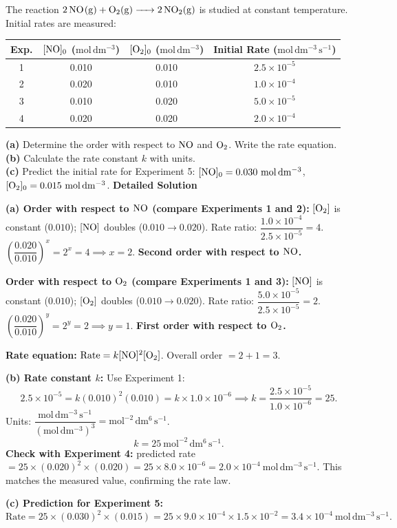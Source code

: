 \documentclass[11pt]{article}
\begin{document}
\begin{exoresolu}
The reaction $\ce{2NO(g) + O2(g) -> 2NO2(g)}$ is studied at constant temperature. Initial rates are measured:

\begin{center}
\begin{tabular}{|c|cc|c|}\hline
Exp. & $[\ce{NO}]_0$ ($\mathrm{mol\,dm^{-3}}$) & $[\ce{O2}]_0$ ($\mathrm{mol\,dm^{-3}}$) & Initial Rate ($\mathrm{mol\,dm^{-3}\,s^{-1}}$) \\ \hline
1 & 0.010 & 0.010 & $2.5 \times 10^{-5}$ \\
2 & 0.020 & 0.010 & $1.0 \times 10^{-4}$ \\
3 & 0.010 & 0.020 & $5.0 \times 10^{-5}$ \\
4 & 0.020 & 0.020 & $2.0 \times 10^{-4}$ \\ \hline
\end{tabular}
\end{center}

\textbf{(a)} Determine the order with respect to $\ce{NO}$ and $\ce{O2}$. Write the rate equation. \\
\textbf{(b)} Calculate the rate constant $k$ with units. \\
\textbf{(c)} Predict the initial rate for Experiment 5: $[\ce{NO}]_0 = 0.030\ \mathrm{mol\,dm^{-3}}$, $[\ce{O2}]_0 = 0.015\ \mathrm{mol\,dm^{-3}}$.
\tcblower
\textbf{Detailed Solution}

\textbf{(a) Order with respect to $\ce{NO}$ (compare Experiments 1 and 2):} $[\ce{O2}]$ is constant ($0.010$); $[\ce{NO}]$ doubles ($0.010 \to 0.020$).
Rate ratio: $\dfrac{1.0 \times 10^{-4}}{2.5 \times 10^{-5}} = 4$.
$\left(\dfrac{0.020}{0.010}\right)^x = 2^x = 4 \implies x = 2$. \textbf{Second order with respect to $\ce{NO}$.}

\textbf{Order with respect to $\ce{O2}$ (compare Experiments 1 and 3):} $[\ce{NO}]$ is constant ($0.010$); $[\ce{O2}]$ doubles ($0.010 \to 0.020$).
Rate ratio: $\dfrac{5.0 \times 10^{-5}}{2.5 \times 10^{-5}} = 2$.
$\left(\dfrac{0.020}{0.010}\right)^y = 2^y = 2 \implies y = 1$. \textbf{First order with respect to $\ce{O2}$.}

\textbf{Rate equation:} $\text{Rate} = k[\ce{NO}]^2[\ce{O2}]$. Overall order $= 2 + 1 = 3$.

\textbf{(b) Rate constant $k$:} Use Experiment 1:
\[ 2.5 \times 10^{-5} = k (0.010)^2 (0.010) = k \times 1.0 \times 10^{-6} \implies k = \frac{2.5 \times 10^{-5}}{1.0 \times 10^{-6}} = 25. \]
Units: $\dfrac{\mathrm{mol\,dm^{-3}\,s^{-1}}}{(\mathrm{mol\,dm^{-3}})^3} = \mathrm{mol^{-2}\,dm^6\,s^{-1}}$.
\[ \boxed{k = 25\ \mathrm{mol^{-2}\,dm^6\,s^{-1}}}. \]
\textbf{Check with Experiment 4:} predicted rate $= 25 \times (0.020)^2 \times (0.020) = 25 \times 8.0 \times 10^{-6} = 2.0 \times 10^{-4}\ \mathrm{mol\,dm^{-3}\,s^{-1}}$. This matches the measured value, confirming the rate law.

\textbf{(c) Prediction for Experiment 5:}
\[ \text{Rate} = 25 \times (0.030)^2 \times (0.015) = 25 \times 9.0 \times 10^{-4} \times 1.5 \times 10^{-2} = \boxed{3.4 \times 10^{-4}\ \mathrm{mol\,dm^{-3}\,s^{-1}}}. \]
\end{exoresolu}
\end{document}

